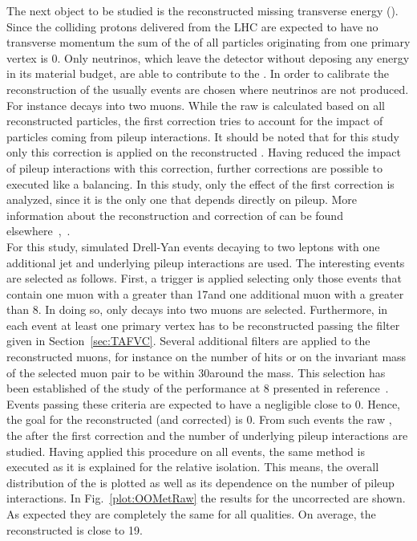 The next object to be studied is the reconstructed missing transverse energy (\MET{}). Since the colliding protons delivered from the LHC are expected to have no transverse momentum the sum of the \pt{} of all particles originating from one primary vertex is 0. Only neutrinos, which leave the detector without deposing any energy in its material budget, are able to contribute to the \MET{}. In order to calibrate the reconstruction of the \MET{} usually events are chosen where neutrinos are not produced. For instance \Zz decays into two muons. While the raw \MET{} is calculated based on all reconstructed particles, the first correction tries to account for the impact of particles coming from pileup interactions. It should be noted that for this study only this correction is applied on the reconstructed \MET{}. Having reduced the impact of pileup interactions with this correction, further corrections are possible to executed like a \pt{} balancing. In this study, only the effect of the first correction is analyzed, since it is the only one that depends directly on pileup. More information about the reconstruction and correction of \MET{} can be found elsewhere~\cite{1748-0221-6-09-P09001},~\cite{CMS-PAS-JME-12-002}.  \\
For this study, simulated Drell-Yan events decaying to two leptons with one additional jet and underlying pileup interactions are used. The interesting events are selected as follows. First, a trigger is applied selecting only those events that contain one muon with a \pt greater than 17\GeV and one additional muon with a \pt greater than 8\GeV. In doing so, only decays into two muons are selected. Furthermore, in each event at least one primary vertex has to be reconstructed passing the filter given in Section~\ref{sec:TAFVC}. Several additional filters are applied to the reconstructed muons, for instance on the number of hits or on the invariant mass of the selected muon pair to be within 30\GeV around the \Zz mass. This selection has been established of the study of the \MET{} performance at 8\TeV{} presented in reference~. Events passing these criteria are expected to have a negligible \MET{} close to 0. Hence, the goal for the reconstructed (and corrected) \MET{} is 0\GeV{}. From such events the raw \MET{}, the \MET{} after the first correction and the number of underlying pileup interactions are studied. Having applied this procedure on all events, the same method is executed as it is explained for the relative isolation. This means,  the overall distribution of the \MET{} is plotted as well as its dependence on the number of pileup interactions. In Fig.~\ref{plot:OOMetRaw} the results for the uncorrected \MET{} are shown. As expected they are completely the same for all qualities. On average, the reconstructed \MET{} is close to 19\GeV. 

